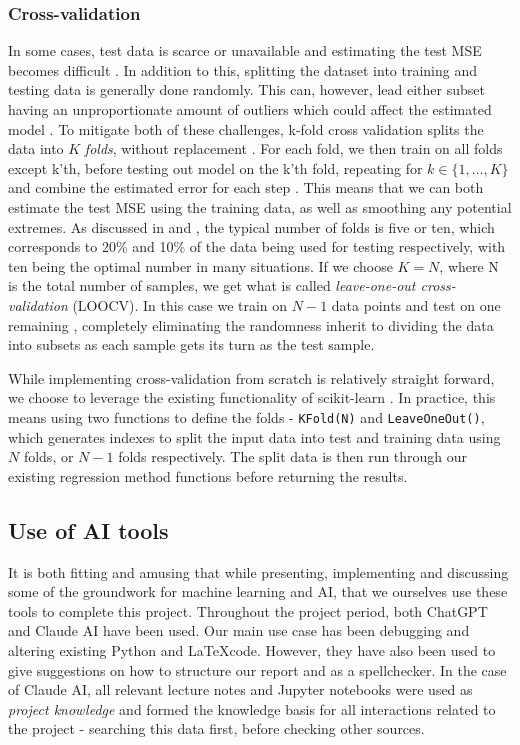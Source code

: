 \documentclass[amssymb,twocolumn,aps]{revtex4}
\begin{document}
\subsubsection{Cross-validation}

In some cases, test data is scarce or unavailable and estimating the test MSE becomes difficult \cite{introstat}. In addition to this, splitting the dataset into training and testing data is generally done randomly. This can, however, lead either subset having an unproportionate amount of outliers which could affect the estimated model \cite{fysml1}. To mitigate both of these challenges, k-fold cross validation splits the data into $K$ \textit{folds}, without replacement \cite{Raschka-et-al-2022}. For each fold, we then train on all folds except k'th, before testing out model on the k'th fold, repeating for $k \in \{1, \dots, K\}$ \cite{murphy1} and combine the estimated error for each step \cite{Hastie-et-al-2009}. This means that we can both estimate the test MSE using the training data, as well as smoothing any potential extremes.
As discussed in \cite{Hastie-et-al-2009} and \cite{Raschka-et-al-2022}, the typical number of folds is five or ten, which corresponds to 20\% and 10\% of the data being used for testing respectively, with ten being the optimal number in many situations. If we choose $K = N$, where N is the total number of samples, we get what is called \textit{leave-one-out cross-validation} (LOOCV). In this case we train on $N - 1$ data points and test on one remaining \cite{Raschka-et-al-2022}, completely eliminating the randomness inherit to dividing the data into subsets as each sample gets its turn as the test sample.

While implementing cross-validation from scratch is relatively straight forward, we choose to leverage the existing functionality of scikit-learn \cite{scikit-learn}. In practice, this means using two functions to define the folds - \texttt{KFold(N)} and \texttt{LeaveOneOut()}, which generates indexes to split the input data into test and training data using $N$ folds, or $N-1$ folds respectively. The split data is then run through our existing regression method functions before returning the results.


\subsection{Use of AI tools}

It is both fitting and amusing that while presenting, implementing and discussing some of the groundwork for machine learning and AI, that we ourselves use these tools to complete this project. Throughout the project period, both ChatGPT\cite{openai2025chatgpt} and Claude AI\cite{anthropic2025claude} have been used. Our main use case has been debugging and altering existing Python and \LaTeX code. However, they have also been used to give suggestions on how to structure our report and as a spellchecker. In the case of Claude AI, all relevant lecture notes and Jupyter notebooks were used as \textit{project knowledge}\cite{anthropic2025projects} and formed the knowledge basis for all interactions related to the project - searching this data first, before checking other sources.
\end{document}
